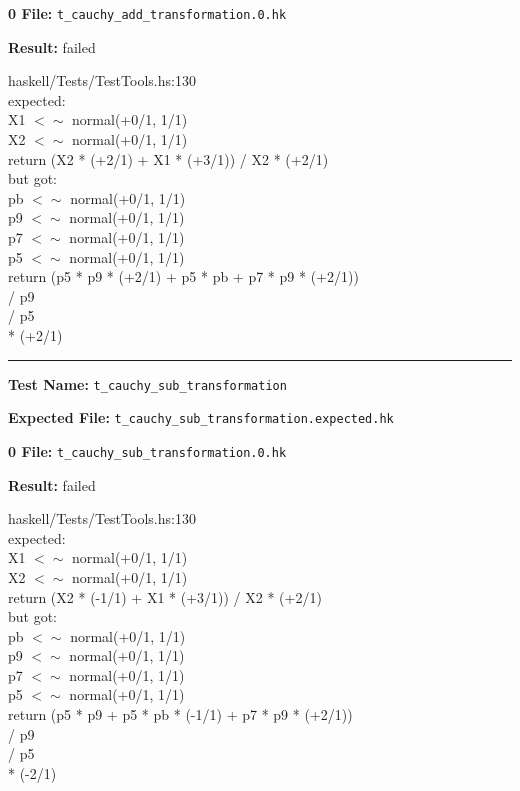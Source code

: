 \documentclass[11pt]{article}
\begin{document}
\bigskip


\bigskip
\textbf{0 File:} {\tt t\_cauchy\_add\_transformation.0.hk}

\bigskip


\bigskip
\textbf{Result:} failed

\bigskip
\noindent


\bigskip
\noindent
haskell/Tests/TestTools.hs:130\\expected:\\X1 $<\sim$ normal(+0/1, 1/1)\\X2 $<\sim$ normal(+0/1, 1/1)\\return (X2 * (+2/1) + X1 * (+3/1)) / X2 * (+2/1)\\but got:\\pb $<\sim$ normal(+0/1, 1/1)\\p9 $<\sim$ normal(+0/1, 1/1)\\p7 $<\sim$ normal(+0/1, 1/1)\\p5 $<\sim$ normal(+0/1, 1/1)\\return (p5 * p9 * (+2/1) + p5 * pb + p7 * p9 * (+2/1))\\       / p9\\       / p5\\       * (+2/1)\\

\hrule

\bigskip
\textbf{Test Name:} {\tt t\_cauchy\_sub\_transformation}

\textbf{Expected File:} {\tt t\_cauchy\_sub\_transformation.expected.hk}

\bigskip


\bigskip
\textbf{0 File:} {\tt t\_cauchy\_sub\_transformation.0.hk}

\bigskip


\bigskip
\textbf{Result:} failed

\bigskip
\noindent


\bigskip
\noindent
haskell/Tests/TestTools.hs:130\\expected:\\X1 $<\sim$ normal(+0/1, 1/1)\\X2 $<\sim$ normal(+0/1, 1/1)\\return (X2 * (-1/1) + X1 * (+3/1)) / X2 * (+2/1)\\but got:\\pb $<\sim$ normal(+0/1, 1/1)\\p9 $<\sim$ normal(+0/1, 1/1)\\p7 $<\sim$ normal(+0/1, 1/1)\\p5 $<\sim$ normal(+0/1, 1/1)\\return (p5 * p9 + p5 * pb * (-1/1) + p7 * p9 * (+2/1))\\       / p9\\       / p5\\       * (-2/1)\\
\end{document}

